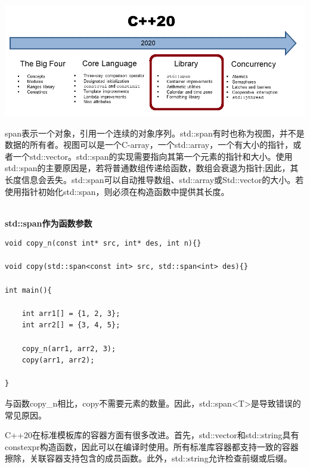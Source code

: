 

\begin{center}
\includegraphics[width=1.0\textwidth]{content/2/chapter3/images/6.png}\\
\end{center}


span表示一个对象，引用一个连续的对象序列。std::span有时也称为视图，并不是数据的所有者。视图可以是一个C-array，一个std::array，一个有大小的指针，或者一个std::vector。std::span的实现需要指向其第一个元素的指针和大小。使用std::span的主要原因是，若将普通数组传递给函数，数组会衰退为指针;因此，其长度信息会丢失。std::span可以自动推导数组、std::array或Std::vector的大小。若使用指针初始化std::span，则必须在构造函数中提供其长度。

\hspace*{\fill} \\ %
\noindent
\textbf{std::span作为函数参数}
\begin{lstlisting}[style=styleCXX]
void copy_n(const int* src, int* des, int n){}

void copy(std::span<const int> src, std::span<int> des){}

int main(){
	
	int arr1[] = {1, 2, 3};
	int arr2[] = {3, 4, 5};
	
	copy_n(arr1, arr2, 3);
	copy(arr1, arr2);
	
}
\end{lstlisting}

与函数copy\_n相比，copy不需要元素的数量。因此，std::span<T>是导致错误的常见原因。


C++20在标准模板库的容器方面有很多改进。首先，std::vector和std::string具有constexpr构造函数，因此可以在编译时使用。所有标准库容器都支持一致的容器擦除，关联容器支持包含的成员函数。此外，std::string允许检查前缀或后缀。

